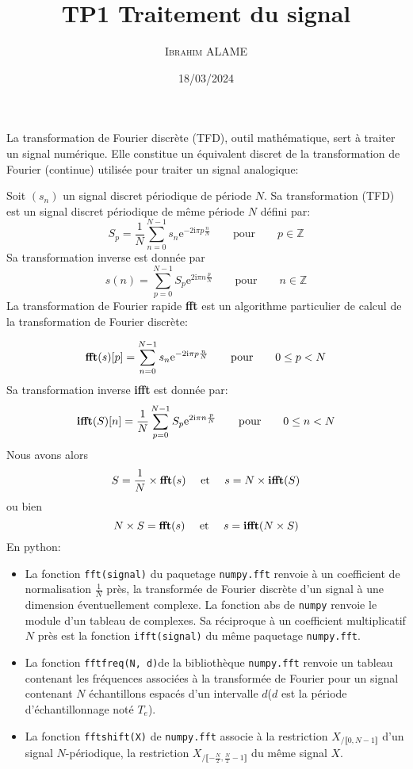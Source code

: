 \documentclass{article}
\title{TP1 Traitement du signal}
\author{ \textsc{Ibrahim ALAME}}
\date{18/03/2024}
\begin{document}
  \lstset{
    frame       = single,
    numbers     = left,
    showspaces  = false,
    showstringspaces    = false,
    captionpos  = t,
    caption     = \lstname
}
\maketitle
La transformation de Fourier discrète (TFD), outil mathématique, sert à traiter un signal numérique. Elle constitue un équivalent discret de la transformation de Fourier (continue) utilisée pour traiter un signal analogique:

Soit $(s_n)$ un signal discret périodique de période $N$. Sa transformation (TFD) est un signal discret périodique de même période $N$ défini par:
\[
{\displaystyle S_p=\frac 1N\sum _{n=0}^{N-1}s_n\mathrm {e} ^{-2\mathrm {i} \pi p{\frac {n}{N}}}\qquad {\text{pour}}\qquad p\in\mathbb{Z}}
\]
Sa transformation inverse est donnée par
\[
{\displaystyle s(n)=\sum _{p=0}^{N-1}S_p\mathrm {e} ^{2\mathrm {i} \pi n{\frac {p}{N}}}\qquad {\text{pour}}\qquad n\in \mathbb{Z}}
\]
La transformation de Fourier rapide {\bf fft}  est un algorithme particulier de calcul de la transformation de Fourier discrète:

\[\mbox {\bf fft}(s)[p]=\sum _{n=0}^{N-1}s_n\mathrm {e} ^{-2\mathrm {i} \pi p{\frac {n}{N}}}\qquad {\text{pour}}\qquad 0\leq p< N\]
Sa transformation inverse {\bf ifft} est donnée par:
 \[
\mbox {\bf ifft}(S)[n]=\frac 1N\sum _{p=0}^{N-1}S_p\mathrm {e} ^{2\mathrm {i} \pi n{\frac {p}{N}}}\qquad {\text{pour}}\qquad 0\leq n< N
\]
Nous avons alors 
 \[ S= \frac 1N\times \mbox {\bf fft}(s) \quad\mbox{ et }\quad s= N\times \mbox {\bf ifft}(S) \]
ou bien 
 \[ N\times S= \mbox {\bf fft}(s) \quad\mbox{ et }\quad s= \mbox {\bf ifft}(N\times S) \]
En python:
\begin{itemize}
\item La fonction {\tt fft(signal)} du paquetage {\tt numpy.fft} renvoie à un coefficient de normalisation $\frac 1N$ près, la transformée de Fourier discrète d'un signal à une dimension éventuellement complexe. La fonction abs de {\tt numpy} renvoie le module d'un tableau de complexes. Sa réciproque à un coefficient multiplicatif $N$ près est la fonction  {\tt ifft(signal)} du même paquetage {\tt numpy.fft}.
\item La fonction {\tt fftfreq(N, d)}de la bibliothèque {\tt numpy.fft} renvoie un tableau contenant les fréquences associées à la transformée de Fourier pour un signal contenant $N$ échantillons espacés d'un intervalle $d$($d$ est la période d'échantillonnage noté $T_e$). 
\item La fonction {\tt fftshift(X)} de {\tt numpy.fft} associe à la restriction $X_{/\llbracket0,N-1\rrbracket}$ d'un signal $N$-périodique, la restriction $X_{/\llbracket-\frac N2,\frac N2-1\rrbracket}$ du même signal $X$.
\end{itemize}
\end{document}
